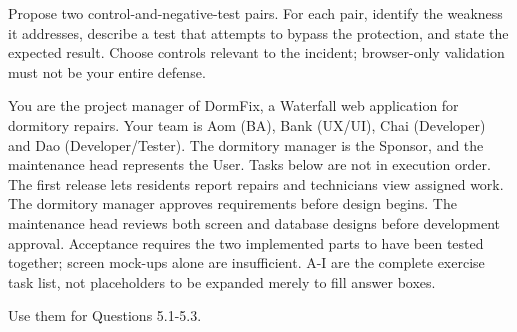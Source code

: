 {Propose two control-and-negative-test pairs. For each pair, identify the weakness it addresses, describe a test that attempts to bypass the protection, and state the expected result. Choose controls relevant to the incident; browser-only validation must not be your entire defense.}
\blankbox{7.7cm}
\answerfill
\newpage
\begin{contenttable}
{You are the project manager of DormFix, a Waterfall web application for dormitory repairs. Your team is Aom (BA), Bank (UX/UI), Chai (Developer) and Dao (Developer/Tester). The dormitory manager is the Sponsor, and the maintenance head represents the User. Tasks below are not in execution order.}
{The first release lets residents report repairs and technicians view assigned work. The dormitory manager approves requirements before design begins. The maintenance head reviews both screen and database designs before development approval. Acceptance requires the two implemented parts to have been tested together; screen mock-ups alone are insufficient. A-I are the complete exercise task list, not placeholders to be expanded merely to fill answer boxes.}
\end{contenttable}
{Use them for Questions 5.1-5.3.}

